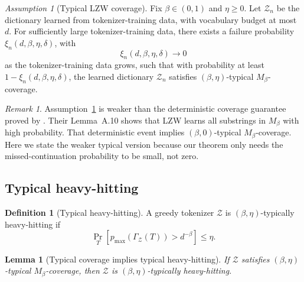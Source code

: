 \documentclass{article}
\theoremstyle{plain}
\newtheorem{lemma}[theorem]{Lemma}
\theoremstyle{definition}
\newtheorem{definition}{Definition}[section]
\theoremstyle{remark}
\newtheorem{remark}{Remark}[section]
\newtheorem{assumption}{Assumption}
\begin{document}
    \begin{assumption}[Typical LZW coverage]
    \label{assump:typical-lzw-coverage}
    Fix $\beta\in(0,1)$ and $\eta\ge 0$. Let $\mathcal Z_n$ be the dictionary
    learned from tokenizer-training data, with vocabulary budget at most $d$.
    For sufficiently large tokenizer-training data, there exists a failure
    probability $\xi_n(d,\beta,\eta,\delta)$, with
    \[
        \xi_n(d,\beta,\eta,\delta)\to 0
    \]
    as the tokenizer-training data grows, such that with probability at least
    $1-\xi_n(d,\beta,\eta,\delta)$, the learned dictionary $\mathcal Z_n$ satisfies
    $(\beta,\eta)$-typical $M_\beta$-coverage.
    \end{assumption}
    
    \begin{remark}
    Assumption~\ref{assump:typical-lzw-coverage} is weaker than the deterministic
    coverage guarantee proved by \citet{rajaramanAnalysisTokenizationTransformers2024}.
    Their Lemma~A.10 shows that LZW learns all substrings in $M_\beta$ with high
    probability. That deterministic event implies $(\beta,0)$-typical
    $M_\beta$-coverage. Here we state the weaker typical version because our theorem
    only needs the missed-continuation probability to be small, not zero.
    \end{remark}
    
    \subsection{Typical heavy-hitting}
    
    \begin{definition}[Typical heavy-hitting]
    \label{def:hh-typical-heavy-hitting}
    A greedy tokenizer $\mathcal Z$ is $(\beta,\eta)$-typically heavy-hitting if
    \[
        \Pr_T\!\left[
            p_{\max}\!\left(\Gamma_{\mathcal Z}(T)\right)>d^{-\beta}
        \right]
        \le
        \eta .
    \]
    \end{definition}
    
    \begin{lemma}[Typical coverage implies typical heavy-hitting]
    \label{lem:typical-coverage-to-typical-heavy}
    If $\mathcal Z$ satisfies $(\beta,\eta)$-typical $M_\beta$-coverage, then
    $\mathcal Z$ is $(\beta,\eta)$-typically heavy-hitting.
    \end{lemma}
    
\end{document}
